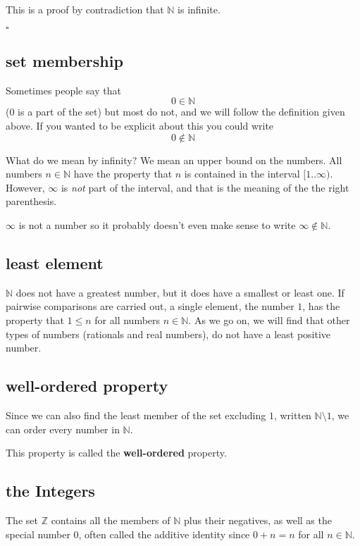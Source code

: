 \documentclass[11pt, oneside]{article}
\begin{document}
This is a proof by contradiction that $\mathbb{N}$ is infinite.

$\square$

\subsection*{set membership}

Sometimes people say that
\[ 0 \in \mathbb{N} \]
(0 is a part of the set) but most do not, and we will follow the definition given above.  If you wanted to be explicit about this you could write
\[ 0 \notin \mathbb{N} \]

What do we mean by infinity?  We mean an upper bound on the numbers.  All numbers $n \in \mathbb{N}$ have the property that $n$ is contained in the interval $[1..\infty)$.  However, $\infty$ is \emph{not} part of the interval, and that is the meaning of the the right parenthesis.

$\infty$ is not a number so it probably doesn't even make sense to write $\infty \notin \mathbb{N}$.

\subsection*{least element}

$\mathbb{N}$ does not have a greatest number, but it does have a smallest or least one.  If pairwise comparisons are carried out, a single element, the number $1$, has the property that $1 \le n$ for all numbers $n \in \mathbb{N}$.  As we go on, we will find that other types of numbers (rationals and real numbers), do not have a least positive number.

\subsection*{well-ordered property}

Since we can also find the least member of the set excluding $1$, written $\mathbb{N} \setminus 1$, we can order every number in $\mathbb{N}$.  

This property is called the \textbf{well-ordered} property.

\subsection*{the Integers}

The set $\mathbb{Z}$ contains all the members of $\mathbb{N}$ plus their negatives, as well as the special number $0$, often called the additive identity since $0 + n = n$ for all $n \in \mathbb{N}$.
\end{document}

